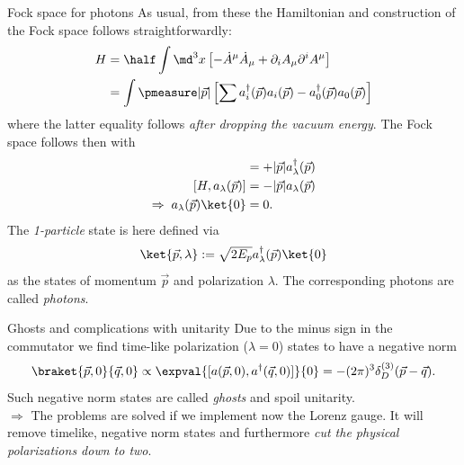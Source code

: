 \begin{mybox}{Fock space for photons}
As usual, from these the Hamiltonian and construction of the Fock space follows straightforwardly:
\begin{align}
	H &= \half \int \md^3 x \left[- \dot{A}^{\mu} \dot{A}_{\mu} + \partial_i A_{\mu} \partial^i A^{\mu} \right] \nonumber \\
	 &= \int  \pmeasure |\vec{p}| \left[\sum a^{\dagger}_i(\vec{p}) a_i(\vec{p}) -a^{\dagger}_0(\vec{p}) a_0(\vec{p})\right]
\end{align}
where the latter equality follows \emph{after dropping the vacuum energy}. The Fock space follows then with
\begin{align}
[H,a^{\dagger}_{\lambda} (\vec{p})] & = + |\vec{p}| a^{\dagger}_{\lambda}(\vec{p}) \\
	[H,a_{\lambda}(\vec{p})] &=-|\vec{p}| a_{\lambda}(\vec{p}) \\
	\Rightarrow \; a_{\lambda}(\vec{p}) \ket{0} &=0.
\end{align}
The \emph{1-particle} state is here defined via
\begin{equation}
	\ket{\vec{p},\lambda} := \sqrt{2 E_p} a^{\dagger}_{\lambda}(\vec{p}) \ket{0}
\end{equation}
as the states of momentum $\vec{p}$ and polarization $\lambda$. The corresponding photons are called \emph{photons}.
\end{mybox}
\begin{mybox}{Ghosts and complications with unitarity}
	Due to the minus sign in the commutator we find time-like polarization ($\lambda=0$) states to have a negative norm
	\begin{equation*}
		\braket{\vec{p},0}{\vec{q},0} \propto \expval{[a(\vec{p},0), a^{\dagger}(\vec{q},0)]}{0} = - (2 \pi)^3 \delta^{(3)}_D(\vec{p}-\vec{q}).
	\end{equation*}
Such negative norm states are called \emph{ghosts} and spoil unitarity.\\
$\Rightarrow$ The problems are solved if we implement now the Lorenz gauge. It will remove timelike, negative norm states and furthermore \emph{cut the physical polarizations down to two}.
\end{mybox}


